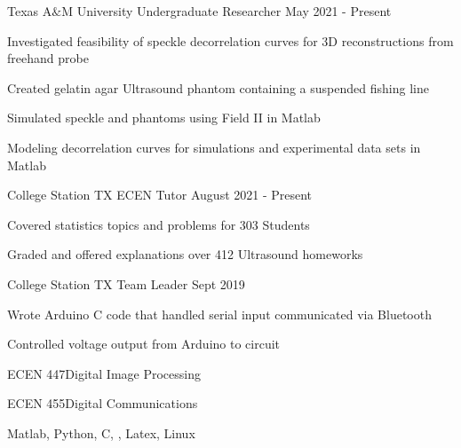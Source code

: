 \documentclass[11pt]{article} %
\begin{document}
\begin{description}
\squish

{Texas A$\&$M University}
{Undergraduate Researcher}
{May 2021 - Present}

Investigated feasibility of speckle decorrelation curves for 3D reconstructions from freehand probe

Created gelatin agar Ultrasound phantom containing a suspended fishing line

Simulated speckle and phantoms using Field II in Matlab

Modeling decorrelation curves for simulations and experimental data sets in Matlab



{College Station TX}
{ECEN Tutor}
{August 2021 - Present}

Covered statistics topics and problems for 303 Students

Graded and offered explanations over 412 Ultrasound homeworks


{College Station TX}
{Team Leader}
{Sept 2019}

Wrote Arduino C code that handled serial input communicated via Bluetooth

Controlled voltage output from Arduino to circuit



%
%


\end{description}

 {}{}

{ECEN 447}{Digital Image Processing}

{ECEN 455}{Digital Communications}

{}{}
{Matlab, Python, C, \CPP, Latex, Linux}
\end{document}
